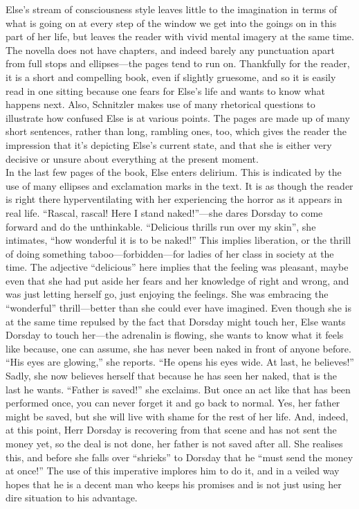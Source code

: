 \documentclass[12pt,a4paper]{article}
\begin{document}
Else's stream of consciousness style leaves little to the imagination in terms of what is going on at every step of the window we get into the goings on in this part of her life, but leaves the reader with vivid mental imagery at the same time. The novella does not have chapters, and indeed barely any punctuation apart from full stops and ellipses---the pages tend to run on. Thankfully for the reader, it is a short and compelling book, even if slightly gruesome, and so it is easily read in one sitting because one fears for Else's life and wants to know what happens next. Also, Schnitzler makes use of many rhetorical questions to illustrate how confused Else is at various points. The pages are made up of many short sentences, rather than long, rambling ones, too, which gives the reader the impression that it's depicting Else's current state, and that she is either very decisive or unsure about everything at the present moment.\\

In the last few pages of the book, Else enters delirium. This is indicated by the use of many ellipses and exclamation marks in the text. It is as though the reader is right there hyperventilating with her experiencing the horror as it appears in real life. ``Rascal, rascal! Here I stand naked!''---she dares Dorsday to come forward and do the unthinkable. ``Delicious thrills run over my skin'', she intimates, ``how wonderful it is to be naked!'' This implies liberation, or the thrill of doing something taboo---forbidden---for ladies of her class in society at the time. The adjective ``delicious'' here implies that the feeling was pleasant, maybe even that she had put aside her fears and her knowledge of right and wrong, and was just letting herself go, just enjoying the feelings. She was embracing the ``wonderful'' thrill---better than she could ever have imagined. Even though she is at the same time repulsed by the fact that Dorsday might touch her, Else wants Dorsday to touch her---the adrenalin is flowing, she wants to know what it feels like because, one can assume, she has never been naked in front of anyone before. ``His eyes are glowing,'' she reports. ``He opens his eyes wide. At last, he believes!'' Sadly, she now believes herself that because he has seen her naked, that is the last he wants. ``Father is saved!'' she exclaims. But once an act like that has been performed once, you can never forget it and go back to normal. Yes, her father might be saved, but she will live with shame for the rest of her life. And, indeed, at this point, Herr Dorsday is recovering from that scene and has not sent the money yet, so the deal is not done, her father is not saved after all. She realises this, and before she falls over ``shrieks'' to Dorsday that he ``must send the money at once!'' The use of this imperative implores him to do it, and in a veiled way hopes that he is a decent man who keeps his promises and is not just using her dire situation to his advantage.\\
\end{document}

